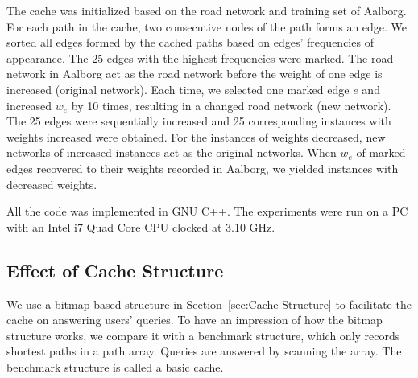 The cache was initialized based on the road network and training set of Aalborg.
For each path in the cache, two consecutive nodes of the path forms an edge. We sorted all edges formed by the cached paths based on edges' frequencies of appearance. The 25 edges with the highest frequencies were marked.
The road network in Aalborg act as the road network before the weight of one edge is increased (original network). Each time, we selected one marked edge $e$ and increased $w_e$ by 10 times, resulting in a changed road network (new network). The 25 edges were sequentially increased and 25 corresponding instances with weights increased were obtained.
For the instances of weights decreased, new networks of increased instances act as the original networks. When $w_e$ of marked edges recovered to their weights recorded in Aalborg, we yielded instances with decreased weights.


All the code was implemented in GNU C++. The experiments were run on a PC with an Intel i7 Quad Core CPU clocked at 3.10 GHz.

\subsection{Effect of Cache Structure}
\label{sec:effect-cache-structure}
We use a bitmap-based structure in Section~\ref{sec:Cache Structure} to facilitate the cache on answering users' queries.
To have an impression of how the bitmap structure works, we compare it with a benchmark structure, which only records shortest paths in a path array.
Queries are answered by scanning the array.
The benchmark structure is called a basic cache.

